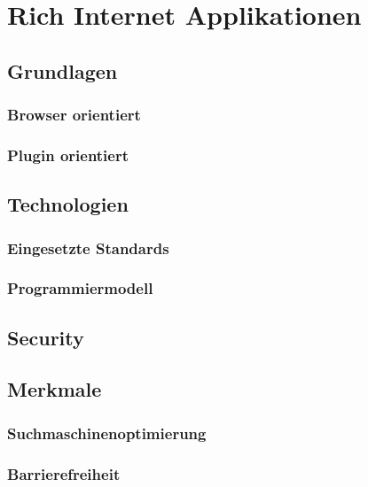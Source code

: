 \documentclass[
11pt, %
a4paper, %
BCOR25mm, %
DIV14, %
footsepline = false, %
headsepline, %
twoside, %
openright,
abstracton, %
listof=totocnumbered, %
bibliography=totocnumbered %
]{scrreprt}
\begin{document}
   
  \chapter{Rich Internet Applikationen}
  
  \section{Grundlagen}

  \subsection{Browser orientiert}
  
  \subsection{Plugin orientiert}
  
  \section{Technologien}
  
  \subsection{Eingesetzte Standards}
  
  \subsection{Programmiermodell}
  
  \section{Security}
  
  \section{Merkmale}
    
  \subsection{Suchmaschinenoptimierung}
  
  \subsection{Barrierefreiheit}
\end{document}
